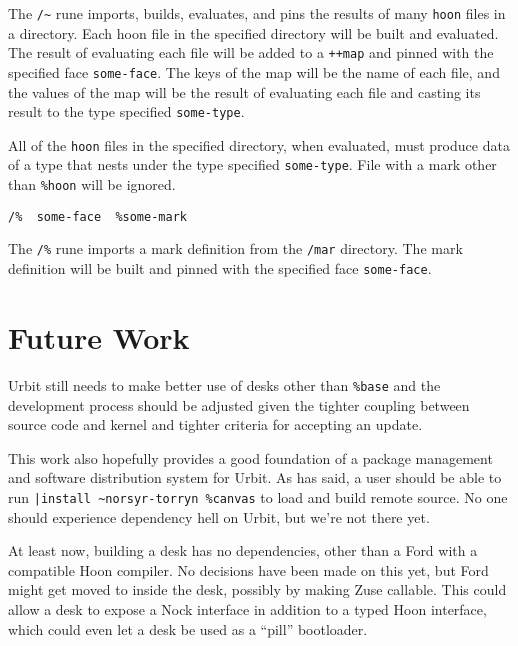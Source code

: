 \documentclass[twoside]{article}
\begin{document}
The \lstinline[style=inlinecode]{/~} rune imports, builds, evaluates, and pins the results of many \lstinline[style=inlinecode]{hoon} files in a directory.  Each hoon file in the specified directory will be built and evaluated. The result of evaluating each file will be added to a \lstinline[style=inlinecode]{++map} and pinned with the specified face \lstinline[style=inlinecode]{some-face}. The keys of the map will be the name of each file, and the values of the map will be the result of evaluating each file and casting its result to the type specified \lstinline[style=inlinecode]{some-type}.

All of the \lstinline[style=inlinecode]{hoon} files in the specified directory, when evaluated, must produce data of a type that nests under the type specified \lstinline[style=inlinecode]{some-type}. File with a mark other than \lstinline[style=inlinecode]{%hoon} will be ignored.

\begin{lstlisting}[style=listingcode]
  /%  some-face  %some-mark
\end{lstlisting}

The \lstinline[style=inlinecode]{/%} rune imports a mark definition from the \lstinline[style=inlinecode]{/mar} directory.  The mark definition will be built and pinned with the specified face \lstinline[style=inlinecode]{some-face}.


\section{Future Work}

Urbit still needs to make better use of desks other than \lstinline[style=inlinecode]{%base} and the development process should be adjusted given the tighter coupling between source code and kernel and tighter criteria for accepting an update.

This work also hopefully provides a good foundation of a package management and software distribution system for Urbit. As  has said, a user should be able to run \lstinline[style=inlinecode]{|install ~norsyr-torryn %canvas} to load and build remote source. No one should experience dependency hell on Urbit, but we're not there yet.

At least now, building a desk has no dependencies, other than a Ford with a compatible Hoon compiler. No decisions have been made on this yet, but Ford might get moved to inside the desk, possibly by making Zuse callable. This could allow a desk to expose a Nock interface in addition to a typed Hoon interface, which could even let a desk be used as a ``pill'' bootloader.
\end{document}
